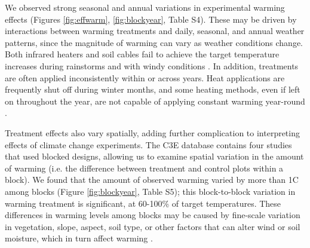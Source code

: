 \documentclass{article}
\begin{document}
\par We observed strong seasonal and annual variations in experimental warming effects (Figures \ref{fig:effwarm}, \ref{fig:blockyear}, Table S4). %
These may be driven by interactions between warming treatments and daily, seasonal, and annual weather patterns, since the magnitude of warming can vary as weather conditions change.  Both infrared heaters and soil cables fail to achieve the target temperature increases during rainstorms \citep{peterjohn1993,hoeppner2012} and with windy conditions \citep{kimball2005,kimball2008}. In addition, treatments are often applied inconsistently within or across years. Heat applications are frequently shut off during winter months, and some heating methods, even if left on throughout the year, are not capable of applying constant warming year-round \citep[e.g.][]{clark2014a,clark2014b,hagedorn2010}. %

\par Treatment effects also vary spatially, adding further complication to interpreting effects of climate change experiments. The C3E database contains four studies that used blocked designs, allowing us to examine spatial variation in the amount of warming (i.e. the difference between treatment and control plots within a block). We found that the amount of observed warming varied by more than 1\degree C among blocks (Figure \ref{fig:blockyear}, Table S5); this block-to-block variation in warming treatment is significant, at 60-100\% of target temperatures. These differences in warming levels among blocks may be caused by fine-scale variation in vegetation, slope, aspect, soil type, or other factors that can alter wind or soil moisture, which in turn affect warming \citep{peterjohn1993,kimball2005,kimball2008,hoeppner2012,rollinson2015}. %
\end{document}
